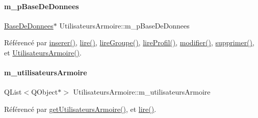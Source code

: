 \paragraph{\texorpdfstring{m\+\_\+p\+Base\+De\+Donnees}{m\_pBaseDeDonnees}}
{\footnotesize\ttfamily \hyperlink{class_base_de_donnees}{Base\+De\+Donnees}$\ast$ Utilisateurs\+Armoire\+::m\+\_\+p\+Base\+De\+Donnees\hspace{0.3cm}{\ttfamily [private]}}



Référencé par \hyperlink{class_utilisateurs_armoire_a773bfde7c49dac8fa2c8a1c9a43592c0}{inserer()}, \hyperlink{class_utilisateurs_armoire_a10b2038874606c0afccf0f18c038dd0c}{lire()}, \hyperlink{class_utilisateurs_armoire_aeadd41da356116c6e393d832e2b819e9}{lire\+Groupe()}, \hyperlink{class_utilisateurs_armoire_a952931c38642273c5e959edb69706144}{lire\+Profil()}, \hyperlink{class_utilisateurs_armoire_affd91d7591d57b8dafc098f09b9319aa}{modifier()}, \hyperlink{class_utilisateurs_armoire_a035d7ca496ddaaf83467934fbd694883}{supprimer()}, et \hyperlink{class_utilisateurs_armoire_a13efbad7862f1c6eff0301c659ec7360}{Utilisateurs\+Armoire()}.

\mbox{\label{class_utilisateurs_armoire_aade1e94417c9729b9e8cadaf19e3227d}} 
\paragraph{\texorpdfstring{m\+\_\+utilisateurs\+Armoire}{m\_utilisateursArmoire}}
{\footnotesize\ttfamily Q\+List$<$Q\+Object$\ast$$>$ Utilisateurs\+Armoire\+::m\+\_\+utilisateurs\+Armoire\hspace{0.3cm}{\ttfamily [private]}}



Référencé par \hyperlink{class_utilisateurs_armoire_a39e5692fe0b00097732bb7633ae5d1e5}{get\+Utilisateurs\+Armoire()}, et \hyperlink{class_utilisateurs_armoire_a10b2038874606c0afccf0f18c038dd0c}{lire()}.

\mbox{\label{class_utilisateurs_armoire_a2a416bb6bd13fb03a2c7cf6f71882a9d}} 
